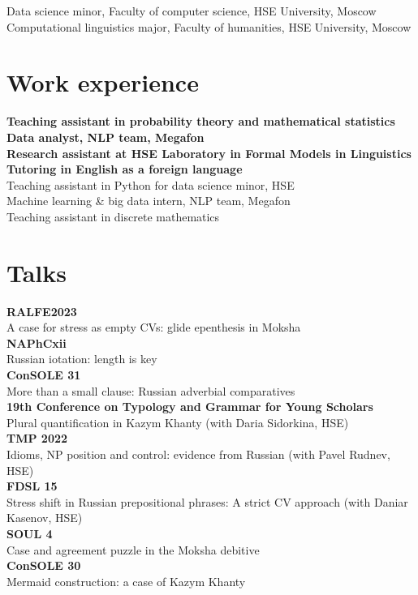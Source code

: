 \documentclass[11pt]{article} %
\begin{document}
 Data science minor, Faculty of computer science, HSE University, Moscow\\
 Computational linguistics major, Faculty of humanities, HSE University, Moscow


\section*{Work experience}

 \textbf{Teaching assistant in probability theory and mathematical statistics}\\
 \textbf{Data analyst, NLP team, Megafon}\\
 \textbf{Research assistant at HSE Laboratory in Formal Models in Linguistics}\\
 \textbf{Tutoring in English as a foreign language}\\
 Teaching assistant in Python for data science minor, HSE\\
 Machine learning \& big data intern, NLP team, Megafon\\
Teaching assistant in discrete mathematics

\section*{Talks}

 \textbf{RALFE2023}\\ A case for stress as empty CVs: glide epenthesis in Moksha\\
 \textbf{NAPhCxii}\\ Russian iotation: length is key\\
 \textbf{ConSOLE 31}\\ More than a small clause: Russian adverbial comparatives\\
 \textbf{19th Conference on Typology and Grammar for Young Scholars}\\ Plural quantification in Kazym Khanty (with Daria Sidorkina, HSE)\\
 \textbf{TMP 2022} \\Idioms, NP position and control: evidence from Russian (with Pavel Rudnev, HSE)\\
 \textbf{FDSL 15} \\Stress shift in Russian prepositional phrases: A strict CV approach (with Daniar Kasenov, HSE)\\
 \textbf{SOUL 4}\\ Case and agreement puzzle in the Moksha debitive\\
 \textbf{ConSOLE 30}\\ Mermaid construction: a case of Kazym Khanty\\
\end{document}
